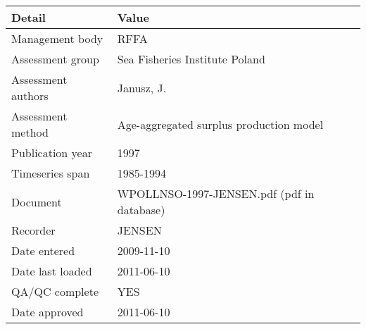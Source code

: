 \begin{table}[htb]
\centering
\begin{tabular}{lp{7cm}}
\toprule
Detail & Value \\
\midrule
Management body    & RFFA                                       \\
Assessment group   & Sea Fisheries Institute Poland             \\
Assessment authors & Janusz, J.                                 \\
Assessment method  & Age-aggregated surplus production model    \\
Publication year   & 1997                                       \\
Timeseries span    & 1985-1994                                  \\
Document           & WPOLLNSO-1997-JENSEN.pdf (pdf in database) \\
Recorder           & JENSEN                                     \\
Date entered       & 2009-11-10                                 \\
Date last loaded   & 2011-06-10                                 \\
QA/QC complete     & YES                                        \\
Date approved      & 2011-06-10                                 \\
\bottomrule
\end{tabular}
\label{tab:assessdet}
\end{table}

